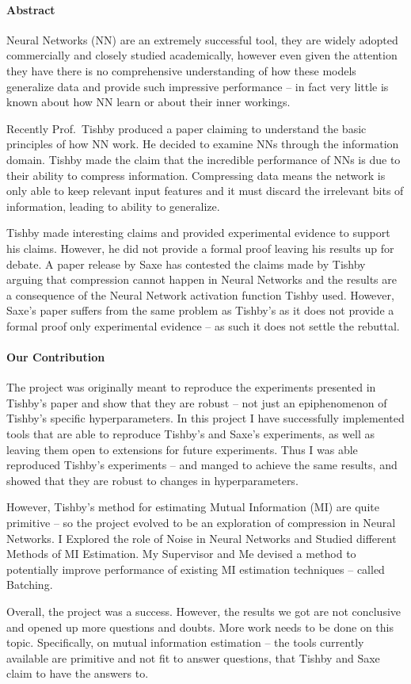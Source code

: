 \documentclass[dissertation.tex]{subfiles}
\begin{document}
\paragraph{Abstract}
Neural Networks (NN) are an extremely successful tool, they are widely adopted
commercially and closely studied academically, however even given the attention
they have there is no comprehensive understanding of how these models generalize
data and provide such impressive performance -- in fact very little is known
about how NN learn or about their inner workings. 

Recently Prof.\ Tishby
\cite{TISHBY} produced a paper claiming to understand the basic principles of
how NN work. He decided to examine NNs through the information domain. Tishby
made the claim that the incredible performance of NNs is due to their ability to
compress information. Compressing data means the network is only able to keep
relevant input features and it must discard the irrelevant bits of information,
leading to ability to generalize. 

Tishby made interesting claims and provided experimental evidence to support his
claims. However, he did not provide a formal proof leaving his results up for
debate. A paper release by Saxe \cite{SAXE} has contested the claims made by
Tishby arguing that compression cannot happen in Neural Networks and the results
are a consequence of the Neural Network activation function Tishby used.
However, Saxe's paper suffers from the same problem as Tishby's as it does not
provide a formal proof only experimental evidence -- as such it does not settle
the rebuttal.

\paragraph{Our Contribution}
The project was originally meant to reproduce the experiments presented in
Tishby's paper and show that they are robust -- not just an epiphenomenon of
Tishby's specific hyperparameters.  In this project I have successfully
implemented tools that are able to reproduce Tishby's and Saxe's experiments, as
well as leaving them open to extensions for future experiments.  Thus I was able
reproduced Tishby's experiments -- and manged to achieve the same results, and
showed that they are robust to changes in hyperparameters. 

However, Tishby's method for estimating Mutual Information (MI) are quite
primitive -- so the project evolved to be an exploration of compression in
Neural Networks. I Explored the role of Noise in Neural Networks and Studied
different Methods of MI Estimation. My Supervisor and Me devised a method to
potentially improve performance of existing MI estimation techniques -- called
Batching.

Overall, the project was a success.  However, the results we got are not
conclusive and opened up more questions and doubts.  More work needs to be done
on this topic.  Specifically, on mutual information estimation -- the tools
currently available are primitive and not fit to answer questions, that Tishby
and Saxe claim to have the answers to.
\end{document}
